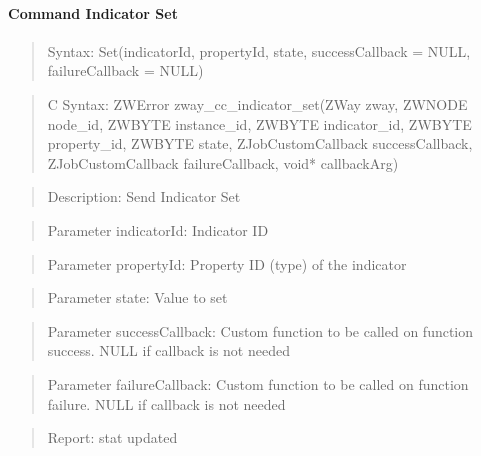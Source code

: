 \paragraph{Command Indicator Set}
\begin{quote}Syntax: Set(indicatorId, propertyId, state, successCallback = NULL, failureCallback = NULL)\end{quote}
\begin{quote}C Syntax: ZWError zway\_cc\_indicator\_set(ZWay zway, ZWNODE node\_id, ZWBYTE instance\_id, ZWBYTE indicator\_id, ZWBYTE property\_id, ZWBYTE state, ZJobCustomCallback successCallback, ZJobCustomCallback failureCallback, void* callbackArg)\end{quote}
\begin{quote}Description: Send Indicator Set\end{quote}
\begin{quote}Parameter indicatorId: Indicator ID\end{quote}
\begin{quote}Parameter propertyId: Property ID (type) of the indicator\end{quote}
\begin{quote}Parameter state: Value to set\end{quote}
\begin{quote}Parameter successCallback: Custom function to be called on function success. NULL if callback is not needed\end{quote}
\begin{quote}Parameter failureCallback: Custom function to be called on function failure. NULL if callback is not needed\end{quote}
\begin{quote}Report: stat updated\end{quote}

